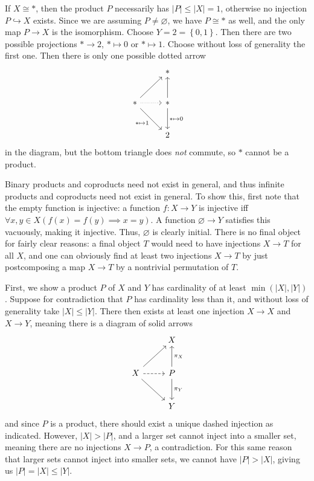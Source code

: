 \documentclass[11pt, letterpaper]{article}
\begin{document}
\begin{enumerate}
		If $X \cong *$, then the product $P$ necessarily has $\left| P \right| \leq \left| X \right| = 1$, otherwise no injection $P\hookrightarrow X$ exists. Since we are assuming $P\neq \varnothing $, we have $P \cong *$ as well, and the only map $P \to X$ is the isomorphism. Choose $Y=2=\left\{ 0,1 \right\} $. Then there are two possible projections $* \to 2$, $*\mapsto 0$ or $*\mapsto 1$. Choose without loss of generality the first one. Then there is only one possible dotted arrow
		\[\begin{tikzcd}[row sep = 2.5em, column sep = 2.5em]
		 & * \\
		* \ar[dotted, r] \ar[ur] \ar[" *\mapsto 1 "', dr]  & * \ar[u] \ar[" *\mapsto 0 ", d]  \\
		 & 2
		\end{tikzcd}\]
		in the diagram, but the bottom triangle does \emph{not} commute, so $*$ cannot be a product.


		Binary products and coproducts need not exist in general, and thus infinite products and coproducts need not exist in general. To show this, first note that the empty function is injective: a function $f : X \to Y$ is injective iff $\forall x,y\in X(f(x)=f(y)\implies x=y)$. A function $\varnothing \to Y$ satisfies this vacuously, making it injective. Thus, $\varnothing $ is clearly initial. There is no final object for fairly clear reasons: a final object $T$ would need to have injections $X\to T$ for all $X$, and one can obviously find at least two injections $X\to T$ by just postcomposing a map $X\to T$ by a nontrivial permutation of $T$.

		First, we show a product $P$ of $X$ and $Y$ has cardinality of at least $\min \left( \left| X \right| ,\left| Y \right|  \right) $. Suppose for contradiction that $P$ has cardinality less than it, and without loss of generality take $\left| X \right| \leq \left| Y \right| $. There then exists at least one injection $X\to X$ and $X\to Y$, meaning there is a diagram of solid arrows
		\[\begin{tikzcd}[row sep = 2.5em, column sep = 2.5em]
		 & X \\
		X \ar[ur] \ar[dr] \ar[dashed, r]  & P\ar[" \pi _X "', u] \ar[" \pi _Y ", d]  \\
		 & Y
		\end{tikzcd}\]
		and since $P$ is a product, there should exist a unique dashed injection as indicated. However, $\left| X \right| >\left| P \right| $, and a larger set cannot inject into a smaller set, meaning there are no injections $X\to P$, a contradiction. For this same reason that larger sets cannot inject into smaller sets, we cannot have $\left| P \right| >\left| X \right| $, giving us $\left| P \right| =\left| X \right| \leq \left| Y \right| $.


\end{enumerate}
\end{document}
